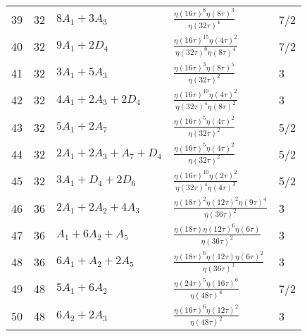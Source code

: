 \documentclass{article}
\theoremstyle{definition}
\begin{document}
\begin{longtable}{|l|l|l|l|l|}
  39 & 32 & $8 A_{1} + 3 A_{3}$ & ${\frac {  \eta \left( 16\tau \right)   ^{8}  \eta \left( 8\tau \right)   ^{3}}{  \eta \left( 32\tau \right)   ^{4}}}$ & 7/2 \\ 
  40 & 32 & $9 A_{1} + 2 D_{4}$ & ${\frac {  \eta \left( 16\tau \right)   ^{15}  \eta \left( 4\tau \right)   ^{2}}{  \eta \left( 32\tau \right)   ^{6} \mbox{}  \eta \left( 8\tau \right)   ^{4}}}$ & 7/2 \\ 
  41 & 32 & $3 A_{1} + 5 A_{3}$ & ${\frac {  \eta \left( 16\tau \right)   ^{3}  \eta \left( 8\tau \right)   ^{5}}{  \eta \left( 32\tau \right)   ^{2}}}$ & 3 \\ 
  42 & 32 & $4 A_{1} + 2 A_{3} + 2 D_{4}$ & ${\frac {  \eta \left( 16\tau \right)   ^{10}  \eta \left( 4\tau \right)   ^{2}}{  \eta \left( 32\tau \right)   ^{4} \mbox{}  \eta \left( 8\tau \right)   ^{2}}}$ & 3 \\ 
  43 & 32 & $5 A_{1} + 2 A_{7}$ & ${\frac {  \eta \left( 16\tau \right)   ^{5}  \eta \left( 4\tau \right)   ^{2}}{  \eta \left( 32\tau \right)   ^{2}}}$ & 5/2 \\ 
  44 & 32 & $2 A_{1} + 2 A_{3} +  A_{7} +  D_{4}$ & ${\frac {  \eta \left( 16\tau \right)   ^{5}  \eta \left( 4\tau \right)   ^{2}}{  \eta \left( 32\tau \right)   ^{2}}}$ & 5/2 \\ 
  45 & 32 & $3 A_{1} +  D_{4} + 2 D_{6}$ & ${\frac {  \eta \left( 16\tau \right)   ^{10}  \eta \left( 2\tau \right)   ^{2}}{  \eta \left( 32\tau \right)   ^{4} \mbox{}  \eta \left( 4\tau \right)   ^{3}}}$ & 5/2 \\ 
  46 & 36 & $2 A_{1} + 2 A_{2} + 4 A_{3}$ & ${\frac {  \eta \left( 18\tau \right)   ^{2}  \eta \left( 12\tau \right)   ^{2}  \eta \left( 9\tau \right)   ^{4} \mbox{}}{  \eta \left( 36\tau \right)   ^{2}}}$ & 3 \\ 
  47 & 36 & $ A_{1} + 6 A_{2} +  A_{5}$ & ${\frac {\eta \left( 18\tau \right)   \eta \left( 12\tau \right)   ^{6}\eta \left( 6\tau \right) }{  \eta \left( 36 \mbox{}\tau \right)   ^{2}}}$ & 3 \\ 
  48 & 36 & $6 A_{1} +  A_{2} + 2 A_{5}$ & ${\frac {  \eta \left( 18\tau \right)   ^{6}\eta \left( 12\tau \right)   \eta \left( 6\tau \right)   ^{2}}{  \eta \left( 36 \mbox{}\tau \right)   ^{3}}}$ & 3 \\ 
  49 & 48 & $5 A_{1} + 6 A_{2}$ & ${\frac {  \eta \left( 24\tau \right)   ^{5}  \eta \left( 16\tau \right)   ^{6}}{  \eta \left( 48\tau \right)   ^{4}}}$ & 7/2 \\ 
  50 & 48 & $6 A_{2} + 2 A_{3}$ & ${\frac {  \eta \left( 16\tau \right)   ^{6}  \eta \left( 12\tau \right)   ^{2}}{  \eta \left( 48\tau \right)   ^{2}}}$ & 3 \\ 

\end{longtable}
\end{document}
